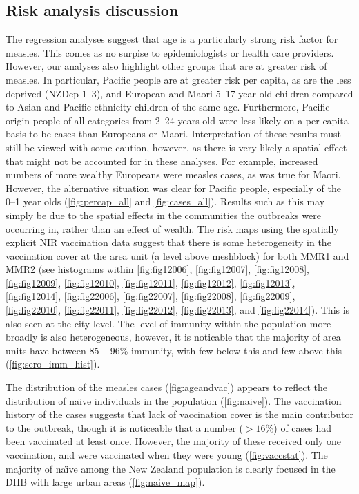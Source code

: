 \documentclass{article}
\begin{document}
\subsection*{Risk analysis discussion}

The regression analyses suggest that age is a particularly strong risk factor for measles. This comes as no surpise to epidemiologists or health care providers. However, our analyses also highlight other groups that are at greater risk of measles. In particular, Pacific people are at greater risk per capita, as are the less deprived (NZDep 1--3), and European and Maori 5--17 year old children compared to Asian and Pacific ethnicity children of the same age. Furthermore, Pacific origin people of all categories from 2--24 years old were less likely on a per capita basis to be cases than Europeans or Maori. Interpretation of these results must still be viewed with some caution, however, as there is very likely a spatial effect that might not be accounted for in these analyses. For example, increased numbers of more wealthy Europeans were measles cases, as was true for Maori. However, the alternative situation was clear for Pacific people, especially of the 0--1 year olds (\autoref{fig:percap_all} and \autoref{fig:cases_all}). Results such as this may simply be due to the spatial effects in the communities the outbreaks were occurring in, rather than an effect of wealth. The risk maps using the spatially explicit NIR vaccination data suggest that there is some heterogeneity in the vaccination cover at the area unit (a level above meshblock) for both MMR1 and MMR2 (see histograms within \autoref{fig:fig12006}, \autoref{fig:fig12007}, \autoref{fig:fig12008}, \autoref{fig:fig12009}, \autoref{fig:fig12010}, \autoref{fig:fig12011}, \autoref{fig:fig12012}, \autoref{fig:fig12013}, \autoref{fig:fig12014}, \autoref{fig:fig22006}, \autoref{fig:fig22007}, \autoref{fig:fig22008}, \autoref{fig:fig22009}, \autoref{fig:fig22010}, \autoref{fig:fig22011}, \autoref{fig:fig22012}, \autoref{fig:fig22013}, and \autoref{fig:fig22014}). This is also seen at the city level. The level of immunity within the population more broadly is also heterogeneous, however, it is noticable that the majority of area units have between 85 -- 96\% immunity, with few below this and few above this (\autoref{fig:sero_imm_hist}).

The distribution of the measles cases (\autoref{fig:ageandvac}) appears to reflect the distribution of na\"{\i}ve individuals in the population (\autoref{fig:naive}). The vaccination history of the cases suggests that lack of vaccination cover is the main contributor to the outbreak, though it is noticeable that a number ($>16\%$) of cases had been vaccinated at least once. However, the majority of these received only one vaccination, and were vaccinated when they were young (\autoref{fig:vaccstat}). The majority of na\"{\i}ve among the New Zealand population is clearly focused in the DHB with large urban areas (\autoref{fig:naive_map}). 
\end{document}
